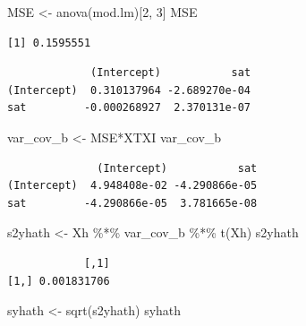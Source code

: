 \documentclass[
]{article}
\newenvironment{Shaded}{\begin{snugshade}}{\end{snugshade}}
\newcommand{\DecValTok}[1]{\textcolor[rgb]{0.00,0.00,0.81}{#1}}
\newcommand{\FunctionTok}[1]{\textcolor[rgb]{0.00,0.00,0.00}{#1}}
\newcommand{\NormalTok}[1]{#1}
\newcommand{\OtherTok}[1]{\textcolor[rgb]{0.56,0.35,0.01}{#1}}
\newcommand{\SpecialCharTok}[1]{\textcolor[rgb]{0.00,0.00,0.00}{#1}}
\begin{document}
\begin{Shaded}
\begin{Highlighting}[]
\NormalTok{MSE }\OtherTok{\textless{}{-}} \FunctionTok{anova}\NormalTok{(mod.lm)[}\DecValTok{2}\NormalTok{, }\DecValTok{3}\NormalTok{]}
\NormalTok{MSE}
\end{Highlighting}
\end{Shaded}

\begin{verbatim}
[1] 0.1595551
\end{verbatim}

\begin{Shaded}
\end{Shaded}

\begin{verbatim}
             (Intercept)           sat
(Intercept)  0.310137964 -2.689270e-04
sat         -0.000268927  2.370131e-07
\end{verbatim}

\begin{Shaded}
\begin{Highlighting}[]
\NormalTok{var\_cov\_b }\OtherTok{\textless{}{-}}\NormalTok{ MSE}\SpecialCharTok{*}\NormalTok{XTXI}
\NormalTok{var\_cov\_b}
\end{Highlighting}
\end{Shaded}

\begin{verbatim}
              (Intercept)           sat
(Intercept)  4.948408e-02 -4.290866e-05
sat         -4.290866e-05  3.781665e-08
\end{verbatim}

\begin{Shaded}
\begin{Highlighting}[]
\NormalTok{s2yhath }\OtherTok{\textless{}{-}}\NormalTok{ Xh }\SpecialCharTok{\%*\%}\NormalTok{ var\_cov\_b }\SpecialCharTok{\%*\%} \FunctionTok{t}\NormalTok{(Xh)}
\NormalTok{s2yhath}
\end{Highlighting}
\end{Shaded}

\begin{verbatim}
            [,1]
[1,] 0.001831706
\end{verbatim}

\begin{Shaded}
\begin{Highlighting}[]
\NormalTok{syhath }\OtherTok{\textless{}{-}} \FunctionTok{sqrt}\NormalTok{(s2yhath)}
\NormalTok{syhath}
\end{Highlighting}
\end{Shaded}
\end{document}
